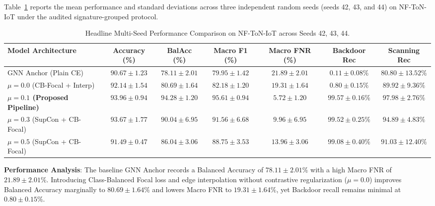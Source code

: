 \documentclass[12pt,a4paper]{report}
\begin{document}
Table~\ref{tab:headline_results} reports the mean performance and standard deviations across three independent random seeds (seeds 42, 43, and 44) on NF-ToN-IoT under the audited signature-grouped protocol.

\begin{table}[H]
\centering
\caption{Headline Multi-Seed Performance Comparison on NF-ToN-IoT across Seeds 42, 43, 44.}
\label{tab:headline_results}
\footnotesize
\setlength{\tabcolsep}{3pt}
\begin{tabularx}{\textwidth}{>{\raggedright\arraybackslash}X c c c c c c}
\toprule
\textbf{Model Architecture} & \textbf{Accuracy (\%)} & \textbf{BalAcc (\%)} & \textbf{Macro F1 (\%)} & \textbf{Macro FNR (\%)} & \textbf{Backdoor Rec} & \textbf{Scanning Rec} \\
\midrule
GNN Anchor (Plain CE) & $90.67 \pm 1.23$ & $78.11 \pm 2.01$ & $79.95 \pm 1.42$ & $21.89 \pm 2.01$ & $0.11 \pm 0.08\%$ & $80.80 \pm 13.52\%$ \\
$\mu = 0.0$ (CB-Focal + Interp) & $92.14 \pm 1.54$ & $80.69 \pm 1.64$ & $82.18 \pm 1.20$ & $19.31 \pm 1.64$ & $0.80 \pm 0.15\%$ & $89.92 \pm 9.36\%$ \\
\textbf{$\mu = 0.1$ (Proposed Pipeline)} & $\mathbf{93.96 \pm 0.94}$ & $\mathbf{94.28 \pm 1.20}$ & $\mathbf{95.61 \pm 0.94}$ & $\mathbf{5.72 \pm 1.20}$ & $\mathbf{99.57 \pm 0.16\%}$ & $\mathbf{97.98 \pm 2.76\%}$ \\
$\mu = 0.3$ (SupCon + CB-Focal) & $93.67 \pm 1.77$ & $90.04 \pm 6.95$ & $91.56 \pm 6.68$ & $9.96 \pm 6.95$ & $99.52 \pm 0.25\%$ & $94.89 \pm 4.83\%$ \\
$\mu = 0.5$ (SupCon + CB-Focal) & $91.49 \pm 0.47$ & $86.04 \pm 3.06$ & $88.75 \pm 3.53$ & $13.96 \pm 3.06$ & $99.08 \pm 0.40\%$ & $91.03 \pm 12.40\%$ \\
\bottomrule
\end{tabularx}
\end{table}

\textbf{Performance Analysis}: The baseline GNN Anchor records a Balanced Accuracy of $78.11 \pm 2.01\%$ with a high Macro FNR of $21.89 \pm 2.01\%$. Introducing Class-Balanced Focal loss and edge interpolation without contrastive regularization ($\mu = 0.0$) improves Balanced Accuracy marginally to $80.69 \pm 1.64\%$ and lowers Macro FNR to $19.31 \pm 1.64\%$, yet Backdoor recall remains minimal at $0.80 \pm 0.15\%$.
\end{document}
